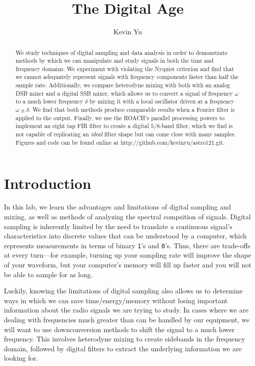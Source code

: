 \documentclass[12pt]{article}
\title{The Digital Age}
\author {
Kevin Yu
}
\begin{document}
\maketitle

\begin{abstract}
We study techniques of digital sampling and data analysis in order to demonstrate methods by which we can manipulate and study signals in both the time and frequency domains. We experiment with violating the Nyquist criterion and find that we cannot adequately represent signals with frequency components faster than half the sample rate. Additionally, we compare  heterodyne mixing with both with an analog DSB mixer and a digital SSB mixer, which allows us to convert a signal of frequency $\omega$ to a much lower frequency $\delta$ by mixing it with a local oscillator driven at a frequency $\omega \pm \delta$. We find that both methods produce comparable results when a Fourier filter is applied to the output. Finally, we use the ROACH's parallel processing powers to implement an eight tap FIR filter to create a digital $5/8$-band filter, which we find is not capable of replicating an \textit{ideal} filter shape but can come close with many samples. Figures and code can be found online at http://github.com/kevinyu/astro121.git. 
\end{abstract}

\section{Introduction}
In this lab, we learn the advantages and limitations of digital sampling and mixing, as well as methods of analyzing the spectral compsition of signals. Digital sampling is inherently limited by the need to translate a continuous signal's characteristics into discrete values that can be understood by a computer, which represents measurements in terms of binary \texttt{1}'s and \texttt{0}'s. Thus, there are trade-offs at every turn---for example, turning up your sampling rate will improve the shape of your waveform, but your computer's memory will fill up faster and you will not be able to sample for as long.

Luckily, knowing the limitations of digital sampling also allows us to determine ways in which we can save time/energy/memory without losing important information about the radio signals we are trying to study. In cases where we are dealing with frequencies much greater than can be handled by our equipment, we will want to use downconversion methods to shift the signal to a much lower frequency. This involves heterodyne mixing to create sidebands in the frequency domain, followed by digital filters to extract the underlying information we are looking for.
\end{document}
